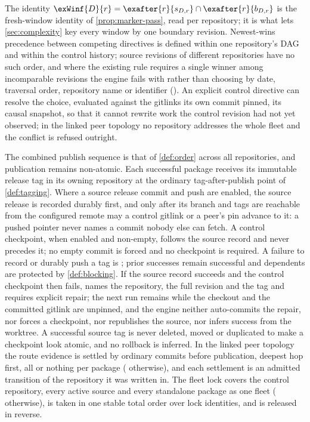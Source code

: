 The identity $\exWinf{D}{r} = \exafter{r}{s_{D,r}} \cap \exafter{r}{b_{D,r}}$
is the fresh-window identity of \cref{prop:marker-pass}, read per
repository; it is what lets \cref{sec:complexity} key every window by one
boundary revision. Newest-wins precedence between competing directives is
defined within one repository's DAG and within the control history; source
revisions of different repositories have no such order, and where the
existing rule requires a single winner among incomparable revisions the
engine fails with  rather than choosing by date, traversal order,
repository name or identifier (). An explicit control directive can
resolve the choice, evaluated against the gitlinks its own commit pinned, its
causal snapshot, so that it cannot rewrite work the control revision had not
yet observed; in the linked peer topology no repository addresses the whole
fleet and the conflict is refused outright.

\begin{definition}
\label{def:exec-recording}
The combined publish sequence is that of \cref{def:order} across all
repositories, and publication remains non-atomic. Each successful package
receives its immutable release tag in its owning repository at the ordinary
tag-after-publish point of \cref{def:tagging}. Where a source release commit
and push are enabled, the source release is recorded durably first, and only
after its branch and tags are reachable from the configured remote may a
control gitlink or a peer's pin advance to it: a pushed pointer never names a
commit nobody else can fetch. A control checkpoint, when enabled and
non-empty, follows the source record and never precedes it; no empty commit
is forced and no checkpoint is required. A failure to record or durably push
a tag is ; prior successes remain successful and dependents are
protected by \cref{def:blocking}. If the source record succeeds and the
control checkpoint then fails,  names the repository, the full
revision and the tag and requires explicit repair; the next run remains
 while the checkout and the committed gitlink are unpinned, and
the engine neither auto-commits the repair, nor forces a checkpoint, nor
republishes the source, nor infers success from the worktree. A successful
source tag is never deleted, moved or duplicated to make a checkpoint look
atomic, and no rollback is inferred. In the linked peer topology the route
evidence is settled by ordinary commits before publication, deepest hop
first, all or nothing per package ( otherwise), and each
settlement is an admitted transition of the repository it was written in.
The fleet lock covers the control repository, every active source and every
standalone package as one fleet ( otherwise), is taken in one
stable total order over lock identities, and is released in reverse.
\end{definition}

